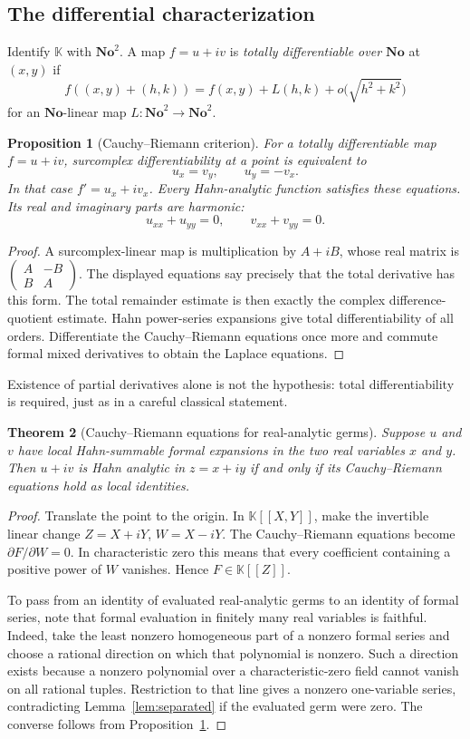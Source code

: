 \documentclass[11pt,a4paper]{article}
\newtheorem{theorem}{Theorem}[section]
\newtheorem{proposition}[theorem]{Proposition}
\theoremstyle{definition}\newtheorem{definition}[theorem]{Definition}
\theoremstyle{remark}\newtheorem{remark}[theorem]{Remark}
\newcommand{\No}{\mathbf{No}}
\newcommand{\K}{\mathbb K}
\numberwithin{equation}{section}
\begin{document}
\subsection{The differential characterization}
Identify $\K$ with $\No^2$. A map $f=u+iv$ is \emph{totally differentiable over $\No$} at $(x,y)$ if
\[
 f((x,y)+(h,k))=f(x,y)+L(h,k)+o\bigl(\sqrt{h^2+k^2}\bigr)
\]
for an $\No$-linear map $L:\No^2\to\No^2$.

\begin{proposition}[Cauchy--Riemann criterion]\label{prop:CR}
For a totally differentiable map $f=u+iv$, surcomplex differentiability at a point is equivalent to
\[
 u_x=v_y,\qquad u_y=-v_x.
\]
In that case $f'=u_x+iv_x$. Every Hahn-analytic function satisfies these equations. Its real and imaginary parts are harmonic:
\[
 u_{xx}+u_{yy}=0,\qquad v_{xx}+v_{yy}=0.
\]
\end{proposition}
\begin{proof}
A surcomplex-linear map is multiplication by $A+iB$, whose real matrix is
$\left(\begin{smallmatrix}A&-B\\B&A\end{smallmatrix}\right)$. The displayed equations say precisely that the total derivative has this form. The total remainder estimate is then exactly the complex difference-quotient estimate. Hahn power-series expansions give total differentiability of all orders. Differentiate the Cauchy--Riemann equations once more and commute formal mixed derivatives to obtain the Laplace equations.
\end{proof}
Existence of partial derivatives alone is not the hypothesis: total differentiability is required, just as in a careful classical statement.

\begin{theorem}[Cauchy--Riemann equations for real-analytic germs]\label{thm:analyticCR}
Suppose $u$ and $v$ have local Hahn-summable formal expansions in the two real variables $x$ and $y$. Then $u+iv$ is Hahn analytic in $z=x+iy$ if and only if its Cauchy--Riemann equations hold as local identities.
\end{theorem}
\begin{proof}
Translate the point to the origin. In $\K[[X,Y]]$, make the invertible linear change
$Z=X+iY$, $W=X-iY$. The Cauchy--Riemann equations become
$\partial F/\partial W=0$. In characteristic zero this means that every coefficient containing a positive power of $W$ vanishes. Hence $F\in\K[[Z]]$.

To pass from an identity of evaluated real-analytic germs to an identity of formal series, note that formal evaluation in finitely many real variables is faithful. Indeed, take the least nonzero homogeneous part of a nonzero formal series and choose a rational direction on which that polynomial is nonzero. Such a direction exists because a nonzero polynomial over a characteristic-zero field cannot vanish on all rational tuples. Restriction to that line gives a nonzero one-variable series, contradicting Lemma~\ref{lem:separated} if the evaluated germ were zero. The converse follows from Proposition~\ref{prop:CR}.
\end{proof}
\end{document}
